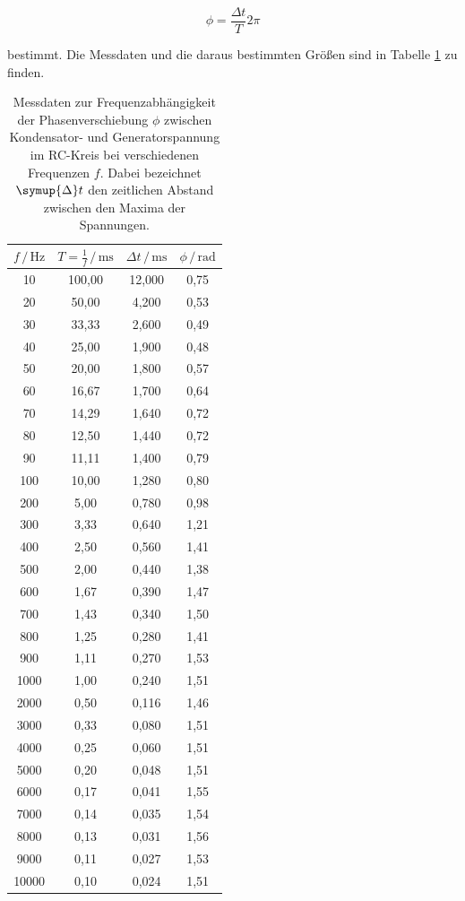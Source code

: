 \begin{equation*}
\phi = \frac{\Delta t}{T} 2 \pi
\end{equation*}

bestimmt. 
Die Messdaten und die daraus bestimmten Größen sind in Tabelle \ref{tab:Messdaten3} zu finden. 

\begin{table}
\centering
\caption{Messdaten zur Frequenzabhängigkeit der Phasenverschiebung $\phi$ zwischen Kondensator-
und Generatorspannung im RC-Kreis bei verschiedenen Frequenzen $f$. Dabei bezeichnet $\symup{\Delta}t$ den
zeitlichen Abstand zwischen den Maxima der Spannungen.}
\label{tab:Messdaten3}
\begin{tabular}{c c c c}
\toprule
$f \,/\, \si{\hertz}$ & $T=\frac{1}{f} \,/\, \si{\milli\second}$ 
&$\Delta t \,/\, \si{\milli\second}$ & $\phi \,/\, \si{\radian}$\\
\midrule
   10 & 100,00 & 12,000 & 0,75\\
   20 &  50,00 &  4,200 & 0,53\\
   30 &  33,33 &  2,600 & 0,49\\
   40 &  25,00 &  1,900 & 0,48\\
   50 &  20,00 &  1,800 & 0,57\\
   60 &  16,67 &  1,700 & 0,64\\
   70 &  14,29 &  1,640 & 0,72\\
   80 &  12,50 &  1,440 & 0,72\\
   90 &  11,11 &  1,400 & 0,79\\
  100 &  10,00 &  1,280 & 0,80\\
  200 &   5,00 &  0,780 & 0,98\\
  300 &   3,33 &  0,640 & 1,21\\
  400 &   2,50 &  0,560 & 1,41\\
  500 &   2,00 &  0,440 & 1,38\\
  600 &   1,67 &  0,390 & 1,47\\
  700 &   1,43 &  0,340 & 1,50\\
  800 &   1,25 &  0,280 & 1,41\\
  900 &   1,11 &  0,270 & 1,53\\
 1000 &   1,00 &  0,240 & 1,51\\
 2000 &   0,50 &  0,116 & 1,46\\
 3000 &   0,33 &  0,080 & 1,51\\
 4000 &   0,25 &  0,060 & 1,51\\
 5000 &   0,20 &  0,048 & 1,51\\
 6000 &   0,17 &  0,041 & 1,55\\
 7000 &   0,14 &  0,035 & 1,54\\
 8000 &   0,13 &  0,031 & 1,56\\
 9000 &   0,11 &  0,027 & 1,53\\
10000 &   0,10 &  0,024 & 1,51\\
\bottomrule
\end{tabular}
\end{table} 

